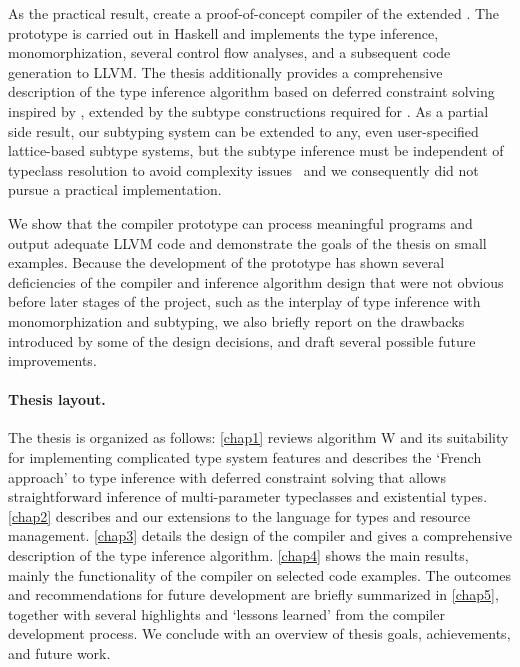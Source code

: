 As the practical result, create a proof-of-concept compiler of the extended \cmm. The prototype is carried out in Haskell and implements the type inference, monomorphization, several control flow analyses, and a subsequent code generation to LLVM. The thesis additionally provides a comprehensive description of the type inference algorithm based on deferred constraint solving inspired by \citet{vytiniotis2011outsidein}, extended by the subtype constructions required for \cmm. As a partial side result, our subtyping system can be extended to any, even user-specified lattice-based subtype systems, but the subtype inference must be independent of typeclass resolution to avoid complexity issues~\cite{tiuryn1992subtype,frey1997subtype} and we consequently did not pursue a practical implementation.

We show that the compiler prototype can process meaningful programs and output adequate LLVM code and demonstrate the goals of the thesis on small examples. Because the development of the prototype has shown several deficiencies of the compiler and inference algorithm design that were not obvious before later stages of the project, such as the interplay of type inference with monomorphization and subtyping, we also briefly report on the drawbacks introduced by some of the design decisions, and draft several possible future improvements.

\paragraph{Thesis layout.}
The thesis is organized as follows:
\cref{chap1} reviews algorithm W and its suitability for implementing complicated type system features and describes the `French approach' to type inference with deferred constraint solving that allows straightforward inference of multi-parameter typeclasses and existential types.
\cref{chap2} describes \cmm and our extensions to the language for types and resource management.
\cref{chap3} details the design of the compiler and gives a comprehensive description of the type inference algorithm.
\cref{chap4} shows the main results, mainly the functionality of the compiler on selected code examples.
The outcomes and recommendations for future development are briefly summarized in \cref{chap5}, together with several highlights and `lessons learned' from the compiler development process.
We conclude with an overview of thesis goals, achievements, and future work.
